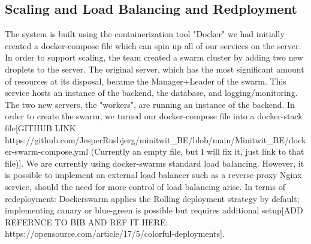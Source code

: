 \subsection{Scaling and Load Balancing and Redployment}

The system is built using the containerization tool "Docker" we had initially created a docker-compose file which can spin up all of our services on the server. In order to support scaling, the team created a swarm cluster by adding two new droplets to the server. The original server, which has the most significant amount of resources at its disposal, became the Manager+Leader of the swarm. This service hosts an instance of the backend, the database, and logging/monitoring. The two new servers, the "workers", are running an instance of the backend. In order to create the swarm, we turned our docker-compose file into a docker-stack file[GITHUB LINK  https://github.com/JesperRusbjerg/minitwit\_BE/blob/main/Minitwit\_BE/docker-swarm-compose.yml (Currently an empty file, but I will fix it, just link to that file)]. We are currently using docker-swarms standard load balancing. However, it is possible to implement an external load balancer such as a reverse proxy Nginx service, should the need for more control of load balancing arise. In terms of redeployment: Dockerswarm applies the Rolling deployment strategy by default; implementing canary or blue-green is possible but requires additional setup[ADD REFERNCE TO BIB AND REF IT HERE: https://opensource.com/article/17/5/colorful-deployments].